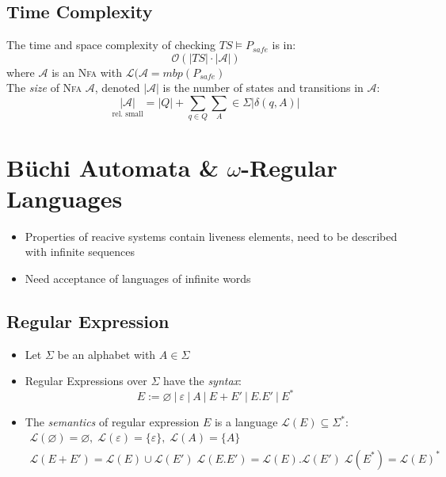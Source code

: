 \documentclass[a4paper, 10pt]{article}
\begin{document}
\subsection*{Time Complexity}
\begin{shaded}
    The time and space complexity of checking $TS\models P_{safe}$ is in:
    \[ \mathcal{O} (|TS|\cdot|\mathcal{A}|) \]
    where $\mathcal{A}$ is an \textsc{Nfa} with $\mathcal{L}(\mathcal{A}=mbp(P_{safe})$
\\ The \emph{size} of \textsc{Nfa} $\mathcal{A}$, denoted $|\mathcal{A}|$ is the number of states and transitions in $\mathcal{A}:$
\[ \underset{\textrm{rel. small}}{|\mathcal{A}|} = |Q| + \sum_{q\in Q} \sum_{A}\in\Sigma |\delta(q,A)| \]
\end{shaded}

\section*{Büchi Automata \& $\omega$-Regular Languages}
\begin{itemize}
    \item Properties of reacive systems contain liveness elements, need to be described with infinite sequences
    \item Need acceptance of languages of infinite words
\end{itemize}
\subsection*{Regular Expression}
\begin{shaded}
\begin{itemize}
    \item Let $\Sigma$ be an alphabet with $A\in\Sigma$
    \item Regular Expressions over $\Sigma$ have the \emph{syntax}:
    \[ E:=\varnothing \ | \ \varepsilon \ | \ A \ | \ E+E'\ | \ E.E'\ | \ E^* \]
    \item The \emph{semantics} of regular expression $E$ is a language $\mathcal{L}(E)\subseteq \Sigma^*$:
    \begin{align*}
    \mathcal{L}(\varnothing) = \varnothing, \; \mathcal{L}(\varepsilon)=\{\varepsilon\},\; \mathcal{L}(A)=\{A\} \\
    \mathcal{L}(E+E') = \mathcal{L}(E)\cup\mathcal{L}(E') \; \mathcal{L}(E.E')=\mathcal{L}(E).\mathcal{L}(E') \; \mathcal{L}(E^*)=\mathcal{L}(E)^*
    \end{align*}
\end{itemize}
\end{shaded}
\end{document}
